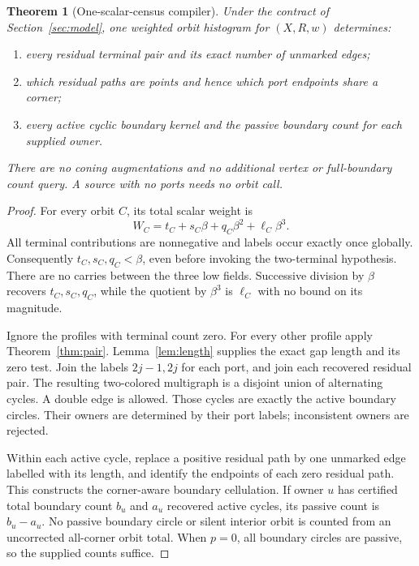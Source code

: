 \documentclass[11pt]{article}
\newtheorem{theorem}{Theorem}[section]
\theoremstyle{definition}\newtheorem{definition}[theorem]{Definition}\newtheorem{example}[theorem]{Example}
\theoremstyle{remark}\newtheorem{remark}[theorem]{Remark}
\begin{document}
\begin{theorem}[One-scalar-census compiler]
\label{thm:scalar}
Under the contract of Section~\ref{sec:model}, one weighted orbit histogram for $(X,R,w)$ determines:
\begin{enumerate}
\item every residual terminal pair and its exact number of unmarked edges;
\item which residual paths are points and hence which port endpoints share a corner;
\item every active cyclic boundary kernel and the passive boundary count for each supplied owner.
\end{enumerate}
There are no coning augmentations and no additional vertex or full-boundary count query. A source with no ports needs no orbit call.
\end{theorem}
\begin{proof}
For every orbit $C$, its total scalar weight is
\begin{equation}\label{eq:packedtotal}
                       W_C=t_C+s_C\beta+q_C\beta^2+\ell_C\beta^3.
\end{equation}
All terminal contributions are nonnegative and labels occur exactly once globally. Consequently $t_C,s_C,q_C<\beta$, even before invoking the two-terminal hypothesis. There are no carries between the three low fields. Successive division by $\beta$ recovers $t_C,s_C,q_C$, while the quotient by $\beta^3$ is $\ell_C$ with no bound on its magnitude.

Ignore the profiles with terminal count zero. For every other profile apply Theorem~\ref{thm:pair}. Lemma~\ref{lem:length} supplies the exact gap length and its zero test. Join the labels $2j-1,2j$ for each port, and join each recovered residual pair. The resulting two-colored multigraph is a disjoint union of alternating cycles. A double edge is allowed. Those cycles are exactly the active boundary circles. Their owners are determined by their port labels; inconsistent owners are rejected.

Within each active cycle, replace a positive residual path by one unmarked edge labelled with its length, and identify the endpoints of each zero residual path. This constructs the corner-aware boundary cellulation. If owner $u$ has certified total boundary count $b_u$ and $a_u$ recovered active cycles, its passive count is $b_u-a_u$. No passive boundary circle or silent interior orbit is counted from an uncorrected all-corner orbit total. When $p=0$, all boundary circles are passive, so the supplied counts suffice.
\end{proof}
\end{document}
